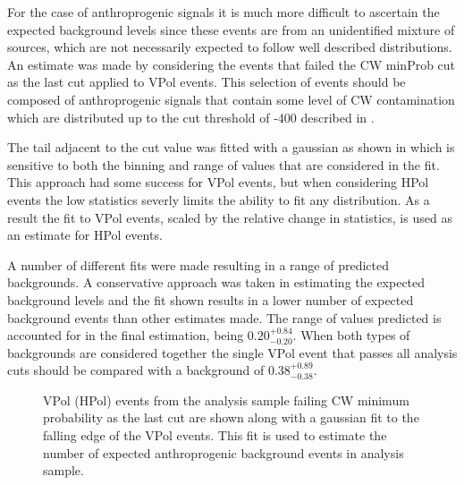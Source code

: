 For the case of anthroprogenic signals it is much more difficult to ascertain the expected background levels since these events are from an unidentified mixture of sources, which are not necessarily expected to follow well described distributions. An estimate was made by considering the events that failed the CW minProb cut as the last cut applied to VPol events. This selection of events should be composed of anthroprogenic signals that contain some level of CW contamination which are distributed up to the cut threshold of -400 described in . 

The tail adjacent to the cut value was fitted with a gaussian as shown in  which is sensitive to both the binning and range of values that are considered in the fit. This approach had some success for VPol events, but when considering HPol events the low statistics severly limits the ability to fit any distribution. As a result the fit to VPol events, scaled by the relative change in statistics, is used as an estimate for HPol events.

A number of different fits were made resulting in a range of predicted backgrounds. A conservative approach was taken in estimating the expected background levels and the fit shown results in a lower number of expected background events than other estimates made. The range of values predicted is accounted for in the final estimation, being $0.20^{+0.84}_{-0.20}$. When both types of backgrounds are considered together the single VPol event that passes all analysis cuts should be compared with a background of $0.38^{+0.89}_{-0.38}$.


\begin{figure}[htpb]
\hfill
{}
\caption{VPol (HPol) events from the analysis sample failing CW minimum probability as the last cut are shown along with a gaussian fit to the falling edge of the VPol events. This fit is used to estimate the number of expected anthroprogenic background events in analysis sample.}
\label{fig:Analysis:Background-Estimation:CW-Background}
\end{figure}
